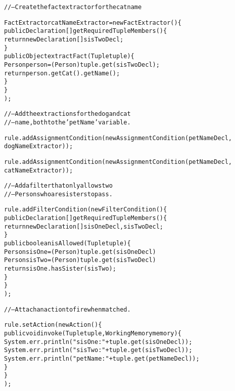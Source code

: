 \begin{alltt}
// -- Create the fact extractor for the cat name

FactExtractor catNameExtractor = new FactExtractor() \{
        public Declaration[] getRequiredTupleMembers() \{
            return new Declaration[] { sisTwoDecl };
        \}
        public Object extractFact(Tuple tuple) \{
            Person person = (Person) tuple.get( sisTwoDecl );
            return person.getCat().getName();
        \}
    \}
      );

// -- Add the extractions for the dog and cat
// -- name, both to the 'petName' variable.

rule.addAssignmentCondition( new AssignmentCondition( petNameDecl,
                                                      dogNameExtractor ) );

rule.addAssignmentCondition( new AssignmentCondition( petNameDecl,
                                                      catNameExtractor ) );

// -- Add a filter that only allows two
// -- Persons who are sisters to pass.

rule.addFilterCondition( new FilterCondition() \{
        public Declaration[] getRequiredTupleMembers() \{
            return new Declaration[] { sisOneDecl, sisTwoDecl };
        \}
        public boolean isAllowed(Tuple tuple) \{
            Person sisOne = (Person) tuple.get( sisOneDecl ) 
            Person sisTwo = (Person) tuple.get( sisTwoDecl ) 
            return sisOne.hasSister( sisTwo )	;
        \} 
    \}
      );

// -- Attach an action to fire when matched.

rule.setAction( new Action() \{
        public void invoke(Tuple tuple, WorkingMemory memory) \{
            System.err.println( "sisOne: " + tuple.get( sisOneDecl ) );
            System.err.println( "sisTwo: " + tuple.get( sisTwoDecl ) );
            System.err.println( "petName: " + tuple.get( petNameDecl ) );
        \}
    \}
      );
\end{alltt}
\normalsize

\newpage
